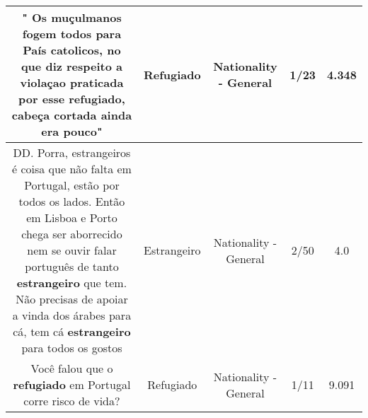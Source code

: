\documentclass[11pt]{article}
\newlength\mylength
\begin{document}
\begin{center}
\begin{longtable}{|C{.65\mylength}|C{.30\mylength}|C{.12\mylength}|C{.12\mylength}|C{.12\mylength}|}
  \small " Os muçulmanos  fogem  todos para País catolicos,  no que diz  respeito a violaçao  praticada   por esse  \textbf{refugiado},  cabeça  cortada ainda era pouco"\normalsize   & Refugiado & Nationality - General & 1/23 & 4.348 \\  \hline
  \small DD. Porra, estrangeiros é coisa que não falta em Portugal, estão por todos os lados. Então em Lisboa e Porto chega ser aborrecido nem se ouvir falar português de tanto \textbf{estrangeiro} que tem. Não precisas de apoiar a vinda dos árabes para cá, tem cá \textbf{estrangeiro} para todos os gostos\normalsize   & Estrangeiro & Nationality - General & 2/50 & 4.0 \\  \hline
  \small Você falou que o \textbf{refugiado} em Portugal corre risco de vida?\normalsize   & Refugiado & Nationality - General & 1/11 & 9.091 \\  \hline

\end{longtable}
\end{center}
\end{document}
